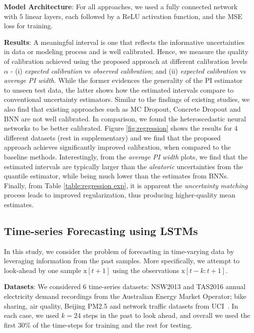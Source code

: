 \documentclass[letterpaper]{article} %
\begin{document}
\noindent \textbf{Model Architecture}: For all approaches, we used a fully connected network with $5$ linear layers, each followed by a ReLU activation function, and the MSE loss for training.

\noindent \textbf{Results}: A meaningful interval is one that reflects the informative uncertainties in data or modeling process and is well calibrated. Hence, we measure the quality of calibration achieved using the proposed approach at different calibration levels $\alpha$ - (i) \textit{expected calibration} vs \textit{observed calibration}; and (ii) \textit{expected calibration} vs \textit{average PI width}. While the former evidences the generality of the PI estimator to unseen test data, the latter shows how the estimated intervals compare to conventional uncertainty estimators. Similar to the findings of existing studies, we also find that existing approaches such as MC Dropout, Concrete Dropout and BNN are not well calibrated. In comparison, we found the heteroscedastic neural networks to be better calibrated. Figure \ref{fig:regression} shows the results for $4$ different datasets (rest in supplementary) and we find that the proposed approach achieves significantly improved calibration, when compared to the baseline methods. Interestingly, from the \textit{average PI width} plots, we find that the estimated intervals are typically larger than the \textit{aleatoric} uncertainties from the quantile estimator, while being much lower than the estimates from BNNs. Finally, from Table \ref{table:regression exp}, it is apparent the \textit{uncertainty matching} process leads to improved regularization, thus producing higher-quality mean estimates.

\subsection{Time-series Forecasting using LSTMs}
In this study, we consider the problem of forecasting in time-varying data by leveraging information from the past samples. More specifically, we attempt to look-ahead by one sample $\mathrm{x}[t+1]$ using the observations $\mathrm{x}[t-k:t+1]$.

\noindent \textbf{Datasets}: We considered $6$ time-series datasets: NSW2013 and TAS2016 annual electricity demand recordings from the Australian Energy Market Operator; bike sharing, air quality, Beijing PM2.5 and network traffic datasets from UCI~\cite{Dua:2019}. In each case, we used $k = 24$ steps in the past to look ahead, and overall we used the first $30\%$ of the time-steps for training and the rest for testing.
\end{document}
